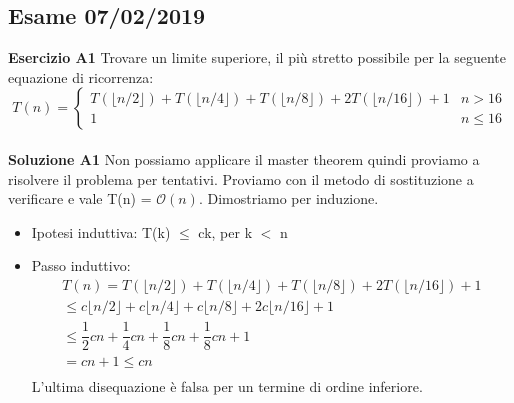 \documentclass[../cheatSheetAlgoritmi.tex]{subfiles}
\begin{document}
\subsection{Esame 07/02/2019}
\textbf{Esercizio A1} Trovare un limite superiore, il più stretto possibile per la seguente equazione di ricorrenza: \
\begin{equation*}
  	T(n)=\begin{cases}
    	T(\lfloor n/2 \rfloor) + T(\lfloor n/4 \rfloor)+ T(\lfloor n/8 \rfloor)+ 2T(\lfloor n/16 \rfloor) + 1 & \text{$n > 16$}\\
    	1 & \text{$n \leq 16$}
  	\end{cases}
\end{equation*} \\
\textbf{Soluzione A1} Non possiamo applicare il master theorem quindi proviamo a risolvere il problema per tentativi. Proviamo con il metodo di sostituzione a verificare e vale T(n) = $\mathcal{O}(n)$. Dimostriamo per induzione.\
\begin{itemize}
	\item Ipotesi induttiva: T(k) $\leq$ ck, per k $<$ n
	\item Passo induttivo:
\begin{equation*}
\begin{aligned}	
T(n)= T(\lfloor n/2 \rfloor) + T(\lfloor n/4 \rfloor)+ T(\lfloor n/8 \rfloor)+ 2T(\lfloor n/16 \rfloor) + 1\\
\text{$\leq$} c\lfloor n/2 \rfloor + c\lfloor n/4 \rfloor+ c\lfloor n/8 \rfloor+ 2c\lfloor n/16 \rfloor + 1\\ 
\text{$\leq$}  \dfrac{1}{2}cn + \dfrac{1}{4}cn + \dfrac{1}{8}cn + \dfrac{1}{8}cn + 1\\
=  cn + 1 \text{$\leq$} cn \\
\end{aligned}
\end{equation*}
L'ultima disequazione è falsa per un termine di ordine inferiore. 
\end{itemize}
\end{document}
